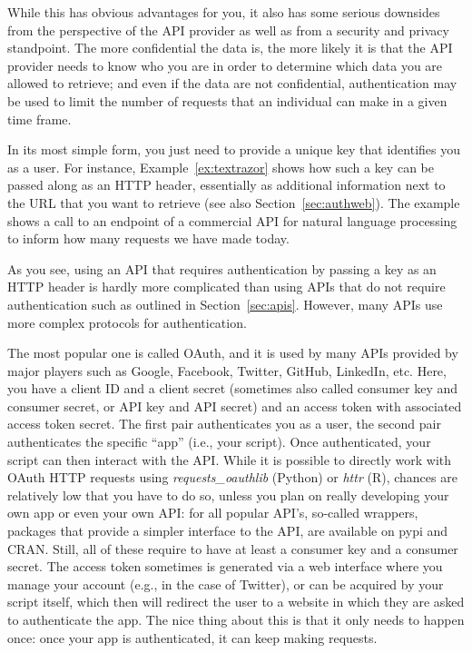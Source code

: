 While this has obvious advantages for you, it also has some serious
downsides from the perspective of the API provider as well as from
a security and privacy standpoint. The more confidential the data is,
the more likely it is that the API provider needs to know who you
are in order to determine which data you are allowed to retrieve;
and even if the data are not confidential, authentication may be
used to limit the number of requests that an individual can make
in a given time frame.

In its most simple form, you just need to provide a unique key that
identifies you as a user. For instance, Example~\ref{ex:textrazor} shows how
such a key can be passed along as an HTTP header, essentially as
additional information next to the URL that you want to retrieve (see
also Section~\ref{sec:authweb}). The example shows a call to an endpoint
of a commercial API for natural language processing to inform how
many requests we have made today.


As you see, using an API that requires authentication by passing a key
as an HTTP header is hardly more complicated than using APIs that do
not require authentication such as outlined in Section~\ref{sec:apis}.
However, many APIs use more complex protocols for authentication.

The most popular one is called OAuth, and it is used by many APIs
provided by major players such as Google, Facebook, Twitter, GitHub,
LinkedIn, etc. Here, you have a client ID and a client secret
(sometimes also called consumer key and consumer secret, or API key and API secret) and an
access token with associated access token secret. The first pair
authenticates you as a user, the second pair authenticates the
specific ``app'' (i.e., your script). Once authenticated, your
script can then interact with the API. While it is possible to
directly work with OAuth HTTP requests using \emph{requests\_oauthlib}
(Python) or \emph{httr} (R), chances are relatively low that you
have to do so, unless you plan on really developing your own app
or even your own API: for all popular API's, so-called wrappers,
packages that provide a simpler interface to the API, are available
on pypi and CRAN. Still, all of these require to have at least
a consumer key and a consumer secret. The access token sometimes
is generated via a web interface where you manage your account
(e.g., in the case of Twitter), or can be acquired by your script
itself, which then will redirect the user to a website in which
they are asked to authenticate the app. The nice thing about this
is that it only needs to happen once: once your app is authenticated,
it can keep making requests.




